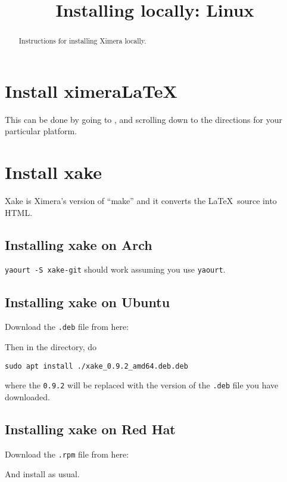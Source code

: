 \documentclass{ximera}
\title{Installing locally: Linux}
\begin{document}
\begin{abstract}
Instructions for installing Ximera locally.
\end{abstract}
\maketitle



\section{Install ximeraLaTeX}

This can be done by going to , and scrolling
down to the directions for your particular platform.




\section{Install xake}

Xake is Ximera's version of ``make'' and it converts the
\LaTeX\ source into HTML.

\subsection{Installing xake on Arch}

\verb!yaourt -S xake-git! should work assuming you use \texttt{yaourt}.

  
\subsection{Installing xake on Ubuntu}

Download the \verb|.deb| file from here:


Then in the directory, do

\begin{verbatim}
sudo apt install ./xake_0.9.2_amd64.deb.deb
\end{verbatim}

where the \verb|0.9.2| will be replaced with the version of the
\verb|.deb| file you have downloaded.

\subsection{Installing xake on Red Hat}

Download the \verb|.rpm| file from here:


And install as usual. 
\end{document}
